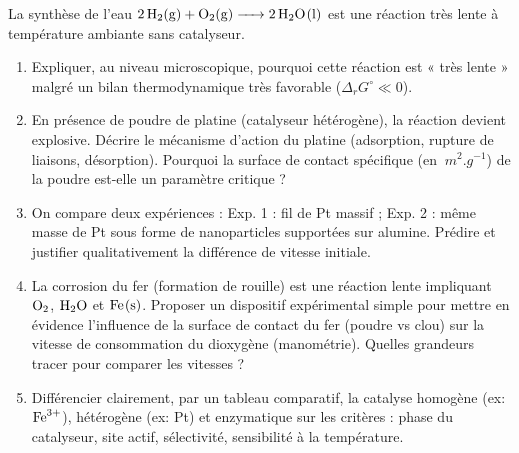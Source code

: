 \documentclass[11pt]{article}
\begin{document}
\begin{exercice}
La synthèse de l'eau $\ce{2 H2(g) + O2(g) -> 2 H2O(l)}$ est une réaction très lente à température ambiante sans catalyseur.
\begin{enumerate}
    \item Expliquer, au niveau microscopique, pourquoi cette réaction est « très lente » malgré un bilan thermodynamique très favorable ($\Delta_r G^\circ \ll 0$).
    \item En présence de poudre de platine (catalyseur hétérogène), la réaction devient explosive. Décrire le mécanisme d'action du platine (adsorption, rupture de liaisons, désorption). Pourquoi la surface de contact spécifique (en $\SI{}{m^2.g^{-1}}$) de la poudre est-elle un paramètre critique ?
    \item On compare deux expériences : Exp. 1 : fil de Pt massif ; Exp. 2 : même masse de Pt sous forme de nanoparticles supportées sur alumine. Prédire et justifier qualitativement la différence de vitesse initiale.
    \item La corrosion du fer (formation de rouille) est une réaction lente impliquant $\ce{O2}$, $\ce{H2O}$ et $\ce{Fe(s)}$. Proposer un dispositif expérimental simple pour mettre en évidence l'influence de la surface de contact du fer (poudre vs clou) sur la vitesse de consommation du dioxygène (manométrie). Quelles grandeurs tracer pour comparer les vitesses ?
    \item Différencier clairement, par un tableau comparatif, la catalyse homogène (ex: $\ce{Fe^{3+}}$), hétérogène (ex: Pt) et enzymatique sur les critères : phase du catalyseur, site actif, sélectivité, sensibilité à la température.
\end{enumerate}
\end{exercice}
\end{document}
